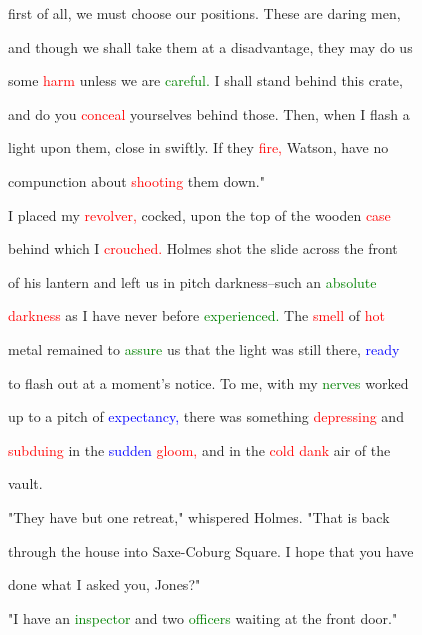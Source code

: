 first of all, we must choose our positions. These are \textcolor{BurntOrange}{daring} men,

 and though we shall take them at a disadvantage, they may do us

 some \textcolor{red}{harm} unless we are \textcolor{green}{careful.} I shall stand behind this crate,

 and do you \textcolor{red}{conceal} yourselves behind those. Then, when I flash a

 light upon them, close in swiftly. If they \textcolor{red}{fire,} Watson, have no

 compunction about \textcolor{red}{shooting} them down."



 I placed my \textcolor{red}{revolver,} cocked, upon the \textcolor{BurntOrange}{top} of the wooden \textcolor{red}{case}

 behind which I \textcolor{red}{crouched.} Holmes \textcolor{BurntOrange}{shot} the slide across the front

 of his lantern and left us in pitch darkness--such an \textcolor{green}{absolute}

 \textcolor{red}{darkness} as I have never before \textcolor{green}{experienced.} The \textcolor{red}{smell} of \textcolor{red}{hot}

 metal remained to \textcolor{green}{assure} us that the light was still there, \textcolor{blue}{ready}

 to flash out at a moment's notice. To me, with my \textcolor{green}{nerves} worked

 up to a pitch of \textcolor{blue}{expectancy,} there was something \textcolor{red}{depressing} and

 \textcolor{red}{subduing} in the \textcolor{blue}{sudden} \textcolor{red}{gloom,} and in the \textcolor{red}{cold} \textcolor{red}{dank} air of the

 vault.



 "They have but one retreat," whispered Holmes. "That is back

 through the house into Saxe-Coburg Square. I \textcolor{BurntOrange}{hope} that you have

 done what I asked you, Jones?"



 "I have an \textcolor{green}{inspector} and two \textcolor{green}{officers} \textcolor{BurntOrange}{waiting} at the front door."



